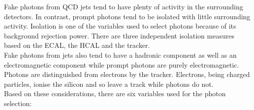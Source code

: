 Fake photons from QCD jets tend to have plenty of activity in the surrounding 
detectors. In contrast, prompt photons tend to be isolated with little 
surrounding activity. Isolation is one of the variables used to select photons 
because of its background rejection power. There are three independent isolation 
measures based on the ECAL, the HCAL and the tracker. \\

Fake photons from jets also tend to have a hadronic component as well as an
electromagnetic component while prompt photons are purely electromagnetic.
Photons are distinguished from electrons by the tracker. Electrons, being 
charged particles, ionise the silicon and so leave a track while photons do not. 
\\ 

Based on these considerations, there are six variables used for the photon 
selection:

